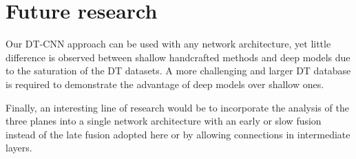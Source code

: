 \documentclass[a4paper,11pt]{article}
\begin{document}
\section{Future research}
Our DT-CNN approach can be used with any network architecture, yet little difference is observed between shallow handcrafted methods and
deep models due to the saturation of the DT datasets.
A more challenging and larger DT database is required to demonstrate the advantage of deep models over shallow ones.

Finally, an interesting line of research would be to incorporate the analysis of the three planes into a single network architecture
with an early or slow fusion instead of the late fusion adopted here or by allowing connections in intermediate layers.
\small{


}
\end{document}

